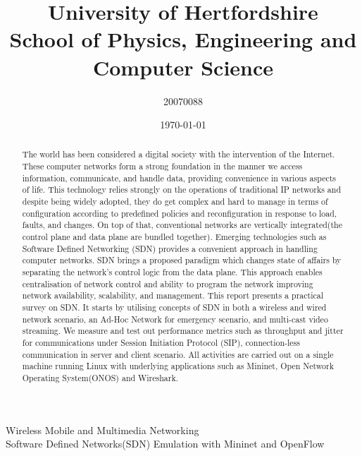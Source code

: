 \documentclass{article}
\title{University of Hertfordshire\\School of Physics, Engineering and Computer Science}
\author{20070088}
\date{\today}
\begin{document}
\maketitle
\begin{center}
	\large{Wireless Mobile and Multimedia Networking} \\[100pt]
	\huge{Software Defined Networks(SDN) Emulation with Mininet and OpenFlow }
\end{center}

\newpage
\tableofcontents
\newpage
\listoftables
\listoffigures

\newpage
\begin{abstract}
The world has been considered a digital society with the intervention of the Internet. These computer networks form a strong foundation in the manner we access information, communicate, and handle data, providing convenience in various aspects of life. This technology relies strongly on the operations of traditional IP networks and despite being widely adopted, they do get complex and hard to manage in terms of configuration according to predefined policies and reconfiguration in response to load, faults, and changes. On top of that, conventional networks are vertically integrated(the control plane and data plane are bundled together). Emerging technologies such as Software Defined Networking (SDN) provides a convenient approach in handling computer networks. SDN brings a proposed paradigm which changes state of affairs by separating the network's control logic from the data plane. This approach enables centralisation of network control and ability to program the network improving network availability, scalability, and management. This report presents a practical survey on SDN. It starts by utilising concepts of SDN in both a wireless and wired network scenario, an Ad-Hoc Network for emergency scenario, and multi-cast video streaming. We measure and test out performance metrics such as throughput and jitter for communications under Session Initiation Protocol (SIP), connection-less communication in server and client scenario. All activities are carried out on a single machine running Linux with underlying applications such as Mininet, Open Network Operating System(ONOS) and Wireshark.
\end{abstract}


\newpage
\end{document}
